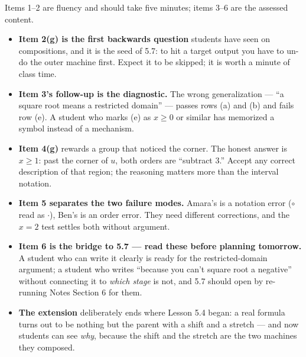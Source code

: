 \documentclass[10pt]{article}
\begin{document}
\begin{teachernote}
\small Items 1--2 are fluency and should take five minutes; items 3--6 are the assessed content.
\begin{itemize}[leftmargin=1.3em, nosep]
  \item \textbf{Item 2(g) is the first backwards question} students have seen on compositions, and
        it is the seed of 5.7: to hit a target output you have to un-do the outer machine first.
        Expect it to be skipped; it is worth a minute of class time.
  \item \textbf{Item 3's follow-up is the diagnostic.} The wrong generalization ---
        ``a square root means a restricted domain'' --- passes rows (a) and (b) and fails row (e).
        A student who marks (e) as $x\ge0$ or similar has memorized a symbol instead of a mechanism.
  \item \textbf{Item 4(g)} rewards a group that noticed the corner. The honest answer is $x\ge1$:
        past the corner of $u$, both orders are ``subtract $3$.'' Accept any correct description of
        that region; the reasoning matters more than the interval notation.
  \item \textbf{Item 5 separates the two failure modes.} Amara's is a notation error ($\circ$ read
        as $\cdot$), Ben's is an order error. They need different corrections, and the $x=2$ test
        settles both without argument.
  \item \textbf{Item 6 is the bridge to 5.7 --- read these before planning tomorrow.} A student who
        can write it clearly is ready for the restricted-domain argument; a student who writes
        ``because you can't square root a negative'' without connecting it to \emph{which stage} is
        not, and 5.7 should open by re-running Notes Section 6 for them.
  \item \textbf{The extension} deliberately ends where Lesson 5.4 began: a real formula turns out to
        be nothing but the parent with a shift and a stretch --- and now students can see \emph{why},
        because the shift and the stretch are the two machines they composed.
\end{itemize}
\end{teachernote}
\end{document}
